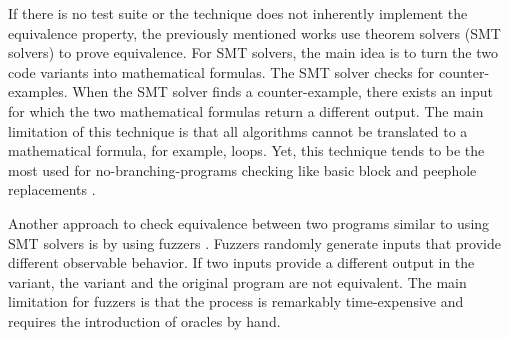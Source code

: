 If there is no test suite or the technique does not inherently implement the equivalence property, the previously mentioned works use theorem solvers (SMT solvers) \cite{SMT_solver} to prove equivalence. For SMT solvers, the main idea is to turn the two code variants into mathematical formulas. The SMT solver checks for counter-examples. When the SMT solver finds a counter-example, there exists an input for which the two mathematical formulas return a different output. The main limitation of this technique is that all algorithms cannot be translated to a mathematical formula, for example, loops. Yet, this technique tends to be the most used for no-branching-programs checking like basic block and peephole replacements \cite{SuperoptimizationScaling}.

Another approach to check equivalence between two programs similar to using SMT solvers is by using fuzzers \cite{zalewski2017american}.
Fuzzers randomly generate inputs that provide different observable behavior. If two inputs provide a different output in the variant, the variant and the original program are not equivalent. The main limitation for fuzzers is that the process is remarkably time-expensive and requires the introduction of oracles by hand.





